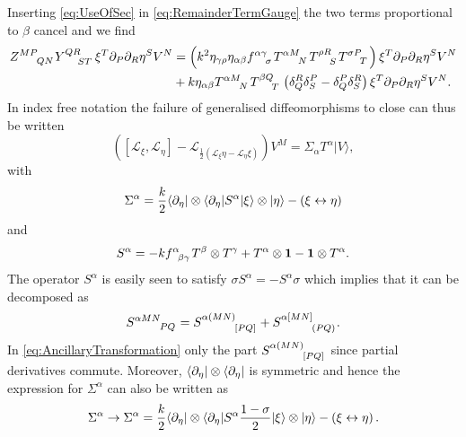 Inserting \eqref{eq:UseOfSec} in \eqref{eq:RemainderTermGauge} the two terms proportional to $\beta$ cancel and we find 
\begin{equation}
    \begin{aligned}
        \tensor{Z}{^{MP}_{QN}}\tensor{Y}{^{QR}_{ST}}\xi^T\pd_P\pd_R\eta^SV^N &= \left(k^2\eta_{\gamma\rho}\eta_{\alpha\beta}\tensor{f}{^{\alpha\gamma}_\sigma}\tensor{T}{^{\alpha M}_N}\tensor{T}{^{\rho R}_S}\tensor{T}{^{\sigma P}_T}\right)\xi^T\pd_P\pd_R\eta^SV^N\\
        &+k\eta_{\alpha\beta}\tensor{T}{^{\alpha M}_N}\tensor{T}{^{\beta Q}_T}\left(\delta^R_Q\delta^P_S-\delta_Q^P\delta_S^R\right) \xi^T\pd_P\pd_R\eta^SV^N.
    \end{aligned}
\end{equation}
In index free notation the failure of generalised diffeomorphisms to close can thus be written
\begin{equation}\label{eq:AncillaryTransformation}
    \left(\left[\mathscr{L}_\xi,\mathscr{L}_\eta\right]-\mathscr{L}_{\frac{1}{2}\left(\mathscr{L}_\xi\eta-\mathscr{L}_\eta\xi\right)}\right)V^M = \Sigma_\alpha T^\alpha |V\rangle,
\end{equation}
with 
\begin{equation}
    \Sigma^\alpha = \frac{k}{2}\langle \partial_\eta|\otimes\langle \partial_\eta| S^\alpha|\xi\rangle \otimes |\eta\rangle - \left(\xi\leftrightarrow\eta\right)
\end{equation}
and 
\begin{equation}\label{eq:STensor}
    S^\alpha = -k\tensor{f}{^{\alpha}_{\beta\gamma}}T^\beta\otimes T^\gamma +T^\alpha\otimes \mathbf{1}-\mathbf{1}\otimes T^\alpha. 
\end{equation}
The operator $S^\alpha$ is easily seen to satisfy $\sigma S^\alpha = -S^\alpha\sigma$ which implies that it can be decomposed as 
\begin{equation}
    \tensor{S}{^{\alpha MN}_{PQ}} = \tensor{S}{^{\alpha (MN)}_{[PQ]}}+\tensor{S}{^{\alpha [MN]}_{(PQ)}}. 
\end{equation}
In \eqref{eq:AncillaryTransformation} only the part $\tensor{S}{^{\alpha (MN)}_{[PQ]}}$ since partial derivatives commute. Moreover, $\langle \partial_\eta|\otimes\langle\partial_\eta|$ is symmetric and hence the expression for $\Sigma^\alpha$ can also be written as
\begin{equation}
    \Sigma^\alpha\to \Sigma^\alpha = \frac{k}{2}\langle \partial_\eta|\otimes\langle \partial_\eta| S^\alpha\frac{1-\sigma}{2}|\xi\rangle \otimes |\eta\rangle - \left(\xi\leftrightarrow\eta\right).
\end{equation}

